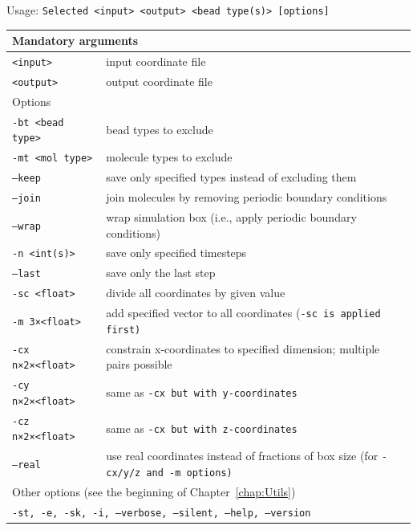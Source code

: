 \vspace{1em}
\noindent
Usage: \tt{Selected <input> <output> <bead type(s)> [options]}
\noindent
\begin{longtable}{p{}p{}}
  \toprule
  \multicolumn{2}{l}{Mandatory arguments}\\
  \midrule
  \tt{<input>}        & input coordinate file\\
  \tt{<output>}       & output coordinate file\\
  \midrule
  \multicolumn{2}{l}{Options}\\
  \midrule
  \tt{-bt <bead type>} & bead types to exclude\\
  \tt{-mt <mol type>}  & molecule types to exclude\\
  \tt{--keep}          & save only specified types instead of excluding them\\
  \tt{--join}          & join molecules by removing periodic boundary
                         conditions\\
  \tt{--wrap}          & wrap simulation box (i.e., apply periodic boundary
                         conditions)\\
  \tt{-n <int(s)>}     & save only specified timesteps\\
  \tt{--last}          & save only the last step\\
  \tt{-sc <float>}     & divide all coordinates by given value\\
  \tt{-m 3×<float>}    & add specified vector to all coordinates (\tt{-sc} is
                         applied first)\\
  \tt{-cx n×2×<float>} & constrain x-coordinates to specified dimension;
                         multiple pairs possible\\
  \tt{-cy n×2×<float>} & same as \tt{-cx} but with y-coordinates\\
  \tt{-cz n×2×<float>} & same as \tt{-cx} but with z-coordinates\\
  \tt{--real}          & use real coordinates instead of fractions of box size
                         (for \tt{-cx/y/z} and \tt{-m} options)\\
  \midrule
  \multicolumn{2}{l}{Other options (see the beginning of
                     Chapter~\ref{chap:Utils})}\\
  \midrule
  \multicolumn{2}{p{0.948\textwidth}}{\tt{-st},
                                      \tt{-e},
                                      \tt{-sk},
                                      \tt{-i},
                                      \tt{--verbose},
                                      \tt{--silent},
                                      \tt{--help},
                                      \tt{--version}}\\
  \bottomrule
\end{longtable}
